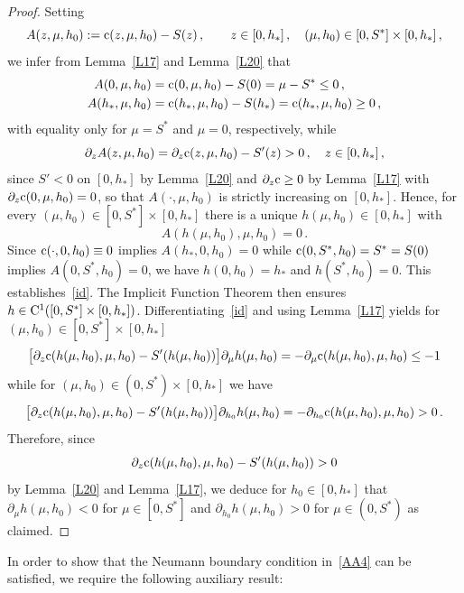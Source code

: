 \documentclass[reqno,11pt]{amsart}
\numberwithin{equation}{section}
\begin{document}
\begin{proof}
Setting
$$
A(z,\mu,h_0):={\rm c}(z,\mu,h_0)-S(z)\,,\qquad z\in [0,h_*]\,,\quad (\mu,h_0)\in [0,S^*]\times [0,h_*]\,,
$$ 
we infer from Lemma~\ref{L17} and Lemma~\ref{L20} that
\begin{align*}
A(0,\mu,h_0)&={\rm c}(0,\mu,h_0)-S(0)=\mu-S^*\le 0\,,\\
A(h_*,\mu,h_0)&={\rm c}(h_*,\mu,h_0)-S(h_*)={\rm c}(h_*,\mu,h_0)\ge 0\,,
\end{align*}
with equality only for $\mu=S^*$ and $\mu=0$, respectively, while
\[
\partial_z A(z,\mu,h_0)=\partial_z{\rm c}(z,\mu,h_0)-S'(z)>0\,,\quad z\in [0,h_*]\,,
\]
since $S'<0$ on $[0,h_*]$ by Lemma~\ref{L20} and $\partial_z{\rm c}\ge0$ by Lemma~\ref{L17} with
$\partial_z{\rm c}(0,\mu,h_0)=0$, so that $A(\cdot,\mu,h_0)$ is strictly increasing on $[0,h_*]$. Hence, for
every $(\mu,h_0)\in [0,S^*]\times [0,h_*]$ there is a unique $h(\mu,h_0)\in [0,h_*]$ with
\[
A(h(\mu,h_0),\mu,h_0)=0\,.
\]
Since ${\rm c}(\cdot,0,h_0)\equiv 0$ implies $A(h_*,0,h_0)=0$ while ${\rm c}(0,S^*,h_0)=S^*=S(0)$  implies
$A(0,S^*,h_0)=0$, we have $h(0,h_0)=h_*$ and $h(S^*,h_0)=0$. 
This establishes~\eqref{id}. The Implicit Function Theorem then ensures $h\in {\rm C}^1([0,S^*]\times [0,h_*])$. Differentiating~\eqref{id} and using  Lemma~\ref{L17} yields for $(\mu,h_0)\in [0,S^*]\times [0,h_*]$
\begin{align}\label{381}
\big[\partial_z{\rm c}(h(\mu,h_0),\mu,h_0)-S'(h(\mu,h_0)) \big]\partial_{\mu} h(\mu,h_0)=-\partial_\mu {\rm c}(h(\mu,h_0),\mu,h_0)\le -1
\end{align}
while for $(\mu,h_0)\in (0,S^*)\times [0,h_*]$ we have
\begin{align}\label{382}
\big[\partial_z {\rm c}(h(\mu,h_0),\mu,h_0)-S'(h(\mu,h_0)) \big]\partial_{h_0} h(\mu,h_0)=-\partial_{h_0} {\rm c}(h(\mu,h_0),\mu,h_0)>0\,.
\end{align}
Therefore, since
\begin{equation}\label{poss}
\partial_z{\rm c}(h(\mu,h_0),\mu,h_0)-S'(h(\mu,h_0))>0
\end{equation}
by Lemma~\ref{L20} and Lemma~\ref{L17}, we deduce for $h_0\in [0,h_*]$ that
$\partial_{\mu} h(\mu,h_0)<0$ for $\mu\in [0,S^*]$ and $\partial_{h_0} h(\mu,h_0)>0$ for $\mu\in (0,S^*)$ as claimed.
\end{proof}


In order to show that the Neumann boundary condition in~\eqref{AA4} can be satisfied, we require the following auxiliary result:
\end{document}
